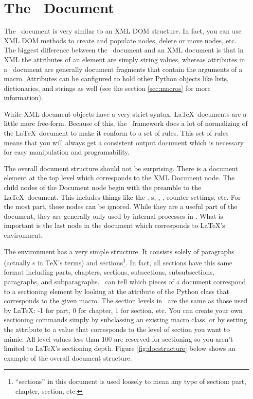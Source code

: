 
\chapter{The \plasTeX\ Document\label{sec:document}}

The \plasTeX\ document is very similar to an XML DOM structure.  In fact,
you can use XML DOM methods to create and populate nodes, delete or move
nodes, etc.  The biggest difference between the \plasTeX\ document and
an XML document is that in XML the attributes of an element are simply 
string values, whereas attributes in a \plasTeX\ document are generally 
document fragments that contain the arguments of a macro.  Attributes can
be canfigured to hold other Python objects like lists, dictionaries, and
strings as well (see the section \ref{sec:macros} for more information).

While XML document objects have a very strict syntax, \LaTeX\ documents
are a little more free-form.  Because of this, the \plasTeX\ framework
does a lot of normalizing of the \LaTeX\ document to make it conform to
a set of rules.  This set of rules means that you will always get a 
consistent output document which is necessary for easy manipulation and
programability.

The overall document structure should not be surprising.  There is a 
document element at the top level which corresponds to the XML Document
node.  The child nodes of the Document node begin with the preamble to 
the \LaTeX\ document.  This includes things like the ,
s, , , counter settings, etc.
For the most part, these nodes can be ignored.  While they are a useful
part of the document, they are generally only used by internal processes
in \plasTeX.  What is important is the last node in the document which
corresponds to \LaTeX's  environment.

The  environment has a very simple structure.  
It consists solely of paragraphs (actually s in \TeX's terms) 
and sections\footnote{``sections'' in
this document is used loosely to mean any type of section: part, chapter, 
section, etc.}.  In fact, all sections have this same format including
parts, chapters, sections, subsections, subsubsections, paragraphs, and
subparagraphs.  \plasTeX\ can tell which pieces of a document correspond
to a sectioning element by looking at the  attribute of the
Python class that corresponds to the given macro.  The section levels in
\plasTeX\ are the same as those used by \LaTeX: -1 for part, 0 for chapter,
1 for section, etc.  You can create your own sectioning commands simply
by subclassing an existing macro class, or by setting the 
attribute to a value that corresponds to the level of section you want
to mimic.  All level values less than 100 are reserved for sectioning so
you aren't limited to \LaTeX's sectioning depth.  Figure \ref{fig:docstructure} 
below shows an example of the overall document structure.

